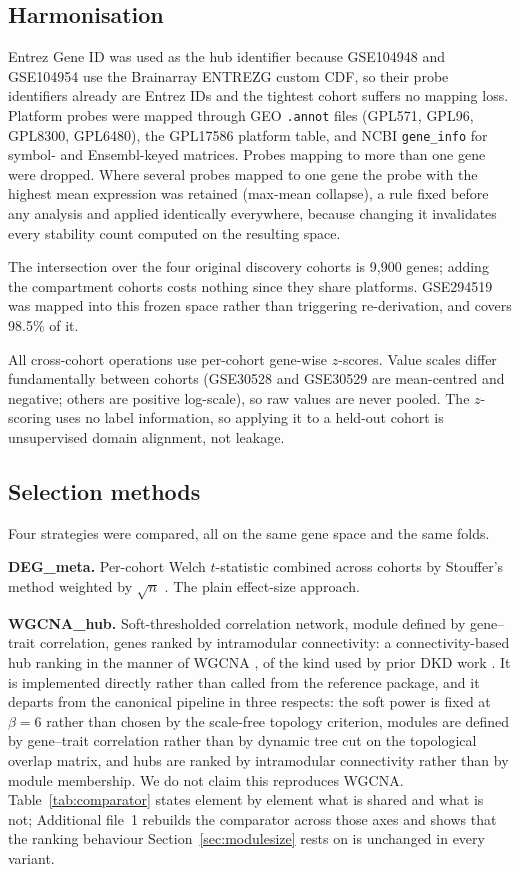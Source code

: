 \documentclass[pdflatex,sn-vancouver-num]{sn-jnl}
\theoremstyle{thmstyleone}
\theoremstyle{thmstyletwo}
\theoremstyle{thmstylethree}
\begin{document}
\subsection{Harmonisation}\label{sec:harmonisation}

Entrez Gene ID was used as the hub identifier because GSE104948 and GSE104954 use the Brainarray
ENTREZG custom CDF, so their probe identifiers already are Entrez IDs and the tightest cohort
suffers no mapping loss. Platform probes were mapped through GEO \texttt{.annot} files (GPL571,
GPL96, GPL8300, GPL6480), the GPL17586 platform table, and NCBI \texttt{gene\_info} for symbol-
and Ensembl-keyed matrices. Probes mapping to more than one gene were dropped. Where several
probes mapped to one gene the probe with the highest mean expression was retained (max-mean
collapse), a rule fixed before any analysis and applied identically everywhere, because changing
it invalidates every stability count computed on the resulting space.

The intersection over the four original discovery cohorts is 9,900 genes; adding the compartment
cohorts costs nothing since they share platforms. GSE294519 was mapped into this frozen space
rather than triggering re-derivation, and covers 98.5\% of it.

All cross-cohort operations use per-cohort gene-wise $z$-scores. Value scales differ
fundamentally between cohorts (GSE30528 and GSE30529 are mean-centred and negative; others are
positive log-scale), so raw values are never pooled. The $z$-scoring uses no label information,
so applying it to a held-out cohort is unsupervised domain alignment, not leakage.

\subsection{Selection methods}\label{sec:selectors}

Four strategies were compared, all on the same gene space and the same folds.

\textbf{DEG\_meta.} Per-cohort Welch $t$-statistic combined across cohorts by Stouffer's method
weighted by $\sqrt{n}$ \cite{whitlock2005}. The plain effect-size approach.

\textbf{WGCNA\_hub.} Soft-thresholded correlation network, module defined by gene--trait
correlation, genes ranked by intramodular connectivity: a connectivity-based hub ranking in the
manner of WGCNA \cite{langfelder2008}, of the kind used by prior DKD work \cite{feng2021}. It is
implemented directly rather than called from the reference package, and it departs from the
canonical pipeline in three respects: the soft power is fixed at $\beta = 6$ rather than chosen
by the scale-free topology criterion, modules are defined by gene--trait correlation rather than
by dynamic tree cut on the topological overlap matrix, and hubs are ranked by intramodular
connectivity rather than by module membership. We do not claim this reproduces WGCNA. Table~\ref{tab:comparator} states element by element what is shared and what is not; Additional file~1 rebuilds the comparator across those axes and shows that the ranking behaviour Section~\ref{sec:modulesize} rests on is unchanged in every variant.
\end{document}
